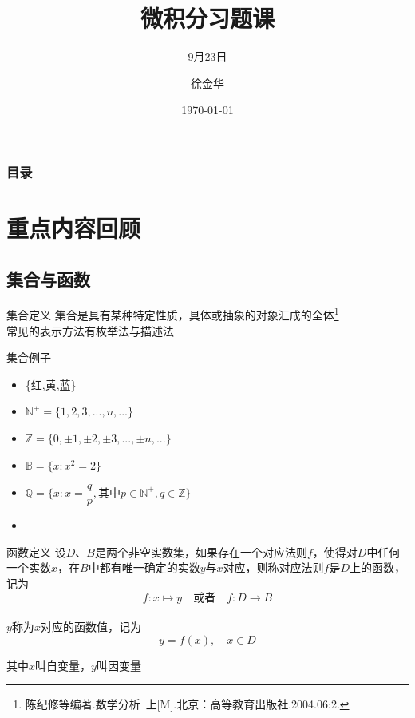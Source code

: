 \documentclass[9pt]{beamer}
\title{微积分习题课}
\subtitle{9月23日}
\author{徐金华}
\institute{数学科学学院,浙江大学 }
\date{\today}
\begin{document}
\titlepage

\begin{frame}
 \frametitle{目录}
 \tableofcontents
\end{frame}

\section{重点内容回顾}

\subsection{集合与函数}

\begin{frame}{集合}{定义}
	\justifying
 集合是具有某种特定性质，具体或抽象的对象汇成的全体\footnote{陈纪修等编著.数学分析\ 上[M].北京：高等教育出版社.2004.06:2.}\\
 
常见的表示方法有枚举法与描述法\\
\end{frame}
\begin{frame}{集合}{例子}
 	\begin{itemize}
		\item \{红,黄,蓝\}
		\item $\mathbb{N}^{+}=\{1,2,3,...,n,...\}$
		\item $\mathbb{Z}=\{0,\pm 1,\pm 2,\pm 3,...,\pm n,...\}$
		\item $\mathbb{B}=\{x:x^2=2\}$
		\item $\mathbb{Q}=\{x:x=\dfrac{q}{p},\text{其中}p \in \mathbb{N}^{+},q \in \mathbb{Z}\}$
		\item {}
	\end{itemize}
\end{frame}

\begin{frame}{函数}{定义}
设$D$、$B$是两个非空实数集，如果存在一个对应法则$f$，使得对$D$中任何一个实数$x$，在$B$中都有唯一确定的实数$y$与$x$对应，则称对应法则$f$是$D$上的函数，记为\\
\begin{equation*}
    f:x \mapsto y \quad \text{或者} \quad f:D \xrightarrow[]{} B
\end{equation*}
 
 $y$称为$x$对应的函数值，记为\\
 \begin{equation*}
    y=f(x),\quad x \in D
\end{equation*}
 
 其中$x$叫自变量，$y$叫因变量
\end{frame}
\end{document}
